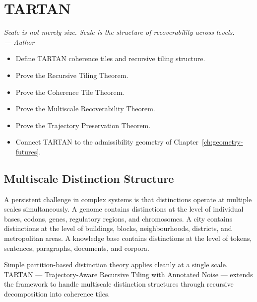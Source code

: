 \documentclass[12pt,twoside,openright]{book}
\newenvironment{epigraph}[2]{%
  \vspace{1em}\begin{flushright}
  \begin{minipage}{0.72\textwidth}
  \itshape\small #1\\[0.4em]
  \upshape\footnotesize\sffamily\color{DistGray}--- #2
  \end{minipage}\end{flushright}\vspace{1.5em}}{}
\newenvironment{objectives}{%
  \begin{tcolorbox}[colback=DistBlue!5,colframe=DistBlue,
    title={\faCheckCircle\enspace Learning Objectives},
    fonttitle=\sffamily\bfseries\color{white},
    attach boxed title to top left={yshift=-2mm,xshift=4mm},
    boxed title style={colback=DistBlue},breakable]
  \begin{itemize}[leftmargin=*,nosep]}{%
  \end{itemize}\end{tcolorbox}\vspace{1em}}
\begin{document}
\chapter{TARTAN}
\label{ch:tartan}

\begin{epigraph}{%
  Scale is not merely size.
  Scale is the structure of recoverability across levels.}%
  {Author}
\end{epigraph}

\begin{objectives}
  \item Define TARTAN coherence tiles and recursive
        tiling structure.
  \item Prove the Recursive Tiling Theorem.
  \item Prove the Coherence Tile Theorem.
  \item Prove the Multiscale Recoverability Theorem.
  \item Prove the Trajectory Preservation Theorem.
  \item Connect TARTAN to the admissibility geometry
        of Chapter~\ref{ch:geometry-futures}.
\end{objectives}

\section{Multiscale Distinction Structure}

A persistent challenge in complex systems is that
distinctions operate at multiple scales simultaneously.
A genome contains distinctions at the level of
individual bases, codons, genes, regulatory regions,
and chromosomes. A city contains distinctions at the
level of buildings, blocks, neighbourhoods, districts,
and metropolitan areas. A knowledge base contains
distinctions at the level of tokens, sentences,
paragraphs, documents, and corpora.

Simple partition-based distinction theory applies
cleanly at a single scale. TARTAN — Trajectory-Aware
Recursive Tiling with Annotated Noise — extends the
framework to handle multiscale distinction structures
through recursive decomposition into coherence tiles.
\end{document}
